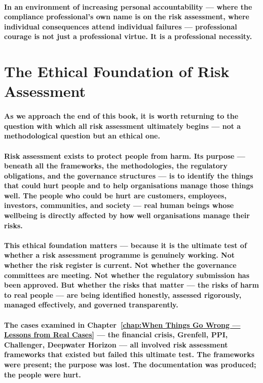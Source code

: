 \paragraph{In an environment of increasing personal accountability — where the compliance professional's own name is on the risk assessment, where individual consequences attend individual failures — professional courage is not just a professional virtue. It is a professional necessity.}

\section{The Ethical Foundation of Risk Assessment}
\paragraph{As we approach the end of this book, it is worth returning to the question with which all risk assessment ultimately begins — not a methodological question but an ethical one.}
\paragraph{Risk assessment exists to protect people from harm. Its purpose — beneath all the frameworks, the methodologies, the regulatory obligations, and the governance structures — is to identify the things that could hurt people and to help organisations manage those things well. The people who could be hurt are customers, employees, investors, communities, and society — real human beings whose wellbeing is directly affected by how well organisations manage their risks.}
\paragraph{This ethical foundation matters — because it is the ultimate test of whether a risk assessment programme is genuinely working. Not whether the risk register is current. Not whether the governance committees are meeting. Not whether the regulatory submission has been approved. But whether the risks that matter — the risks of harm to real people — are being identified honestly, assessed rigorously, managed effectively, and governed transparently.}
\paragraph{The cases examined in Chapter~\ref{chap:When Things Go Wrong — Lessons from Real Cases} — the financial crisis, Grenfell, PPI, Challenger, Deepwater Horizon — all involved risk assessment frameworks that existed but failed this ultimate test. The frameworks were present; the purpose was lost. The documentation was produced; the people were hurt.}
